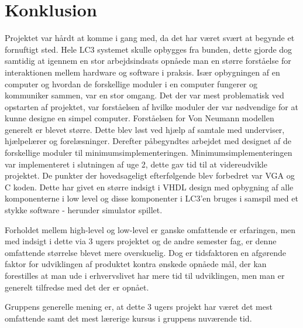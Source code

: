 \chapter{Konklusion}\label{cha:konklusion}

Projektet var hårdt at komme i gang med, da det har været svært at begynde et fornuftigt sted. Hele LC3 systemet skulle opbygges fra bunden, dette gjorde dog samtidig at igennem en stor arbejdsindsats opnåede man en større forståelse for interaktionen mellem hardware og software i praksis. Især opbygningen af en computer og hvordan de forskellige moduler i en computer fungerer og kommuniker sammen, var en stor omgang. Det der var mest problematisk ved opstarten af projektet, var forståelsen af hvilke moduler der var nødvendige for at kunne designe en simpel computer. Forståelsen for Von Neumann modellen generelt er blevet større. Dette blev løst ved hjælp af samtale med underviser, hjælpelærer og forelæsninger. Derefter påbegyndtes arbejdet med designet af de forskellige moduler til minimumsimplementeringen. Minimumsimplementeringen var implementeret i slutningen af uge 2, dette gav tid til at videreudvikle projektet. De punkter der hovedsageligt efterfølgende blev forbedret var VGA og C koden. 
Dette har givet en større indsigt i VHDL design med opbygning af alle komponenterne i low level og disse komponenter i LC3'en bruges i samspil med et stykke software - herunder simulator spillet.  
 
Forholdet mellem high-level og low-level er ganske omfattende er erfaringen, men med indsigt i dette via 3 ugers projektet og de andre semester fag, er denne omfattende størrelse blevet mere overskuelig.
Dog er tidsfaktoren en afgørende faktor for udviklingen af produktet kontra ønskede opnåede mål, der kan forestilles at man ude i erhvervslivet har mere tid til udviklingen, men man er generelt tilfredse med det der er opnået. 

Gruppens generelle mening er, at dette 3 ugers projekt har været det mest omfattende samt det mest lærerige kursus i gruppens nuværende tid. 
